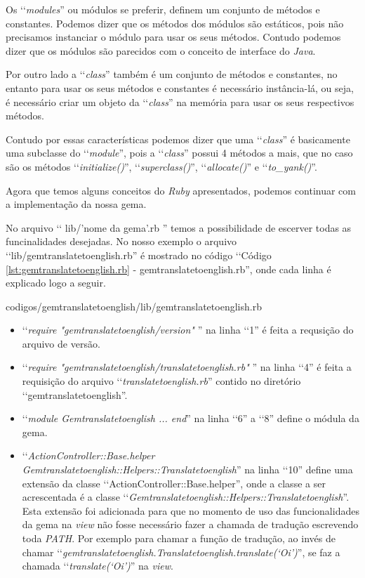 Os ‘‘\emph{modules}'' ou módulos se preferir, definem um conjunto de métodos e constantes. Podemos 
dizer que os métodos dos módulos são estáticos, pois não precisamos instanciar o módulo para usar os
seus métodos. Contudo podemos dizer que os módulos são parecidos com o conceito de interface do 
\emph{Java}. 

Por outro lado a ‘‘\emph{class}'' também é um conjunto de métodos e constantes, no 
entanto para usar os seus métodos e constantes é necessário instância-lá, ou seja, é necessário criar 
um objeto da ‘‘\emph{class}'' na memória para usar os seus respectivos métodos. 

Contudo por essas características podemos dizer que uma ‘‘\emph{class}'' é basicamente 
uma subclasse do ‘‘\emph{module}'', pois a ‘‘\emph{class}'' possui 4 métodos a mais, que no caso são 
os métodos ‘‘\emph{initialize()}'', ‘‘\emph{superclass()}'', ‘‘\emph{allocate()}'' e ‘‘\emph{to\_yank()}''.

Agora que temos alguns conceitos do \emph{Ruby} apresentados, podemos continuar com a implementação 
da nossa gema. 

No arquivo ‘‘ lib/'nome da gema'.rb '' temos a possibilidade de escerver todas as 
funcinalidades desejadas. No nosso exemplo o arquivo ‘‘lib/gemtranslatetoenglish.rb'' é mostrado no código 
‘‘Código \ref{lst:gemtranslatetoenglish.rb} - gemtranslatetoenglish.rb'', onde cada linha é explicado 
logo a seguir.


{codigos/gemtranslatetoenglish/lib/gemtranslatetoenglish.rb}

\begin{itemize}

 \item ‘‘\emph{require "gemtranslatetoenglish/version"} '' na linha ‘‘1'' é feita a requsição do arquivo de
 versão.
 
 \item ‘‘\emph{require "gemtranslatetoenglish/translatetoenglish.rb"} '' na linha ‘‘4'' é feita a requisição
 do arquivo ‘‘\emph{translatetoenglish.rb}'' contido no diretório ‘‘gemtranslatetoenglish''.
 
 \item ‘‘\emph{module Gemtranslatetoenglish ... end}'' na linha ‘‘6'' a ‘‘8'' define o módula da gema.
 
 \item ‘‘\emph{ActionController::Base.helper Gemtranslatetoenglish::Helpers::Translatetoenglish}'' na linha 
 ‘‘10'' define uma extensão da classe ‘‘ActionController::Base.helper'', onde a classe a ser acrescentada é
 a classe ‘‘\emph{Gemtranslatetoenglish::Helpers::Translatetoenglish}''. Esta extensão foi adicionada
 para que no momento de uso das funcionalidades da gema na \emph{view} não fosse necessário fazer a chamada 
 de tradução  escrevendo toda \emph{PATH}. Por exemplo para chamar a função de tradução, ao invés
 de chamar ‘‘\emph{gemtranslatetoenglish.Translatetoenglish.translate(‘Oi’)}'', se faz a chamada 
 ‘‘\emph{translate(‘Oi’)}'' na \emph{view}.
 
\end{itemize}

